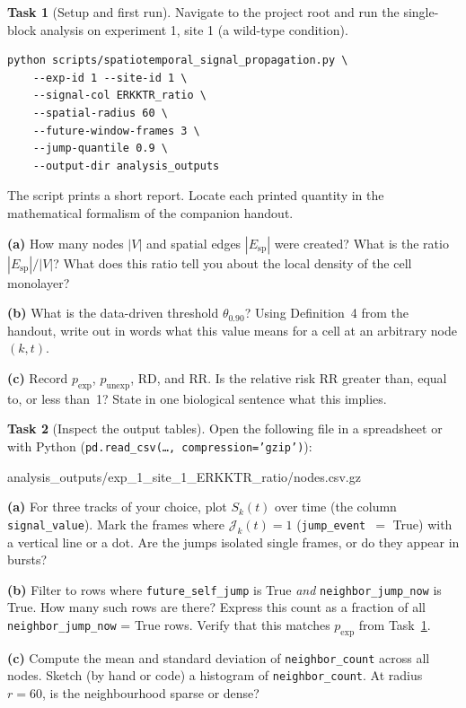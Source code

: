 \documentclass[11pt,a4paper]{article}
\theoremstyle{definition}
\newtheorem{task}{Task}
\newcommand{\sig}[2]{S_{#1}(#2)}
\newcommand{\JE}[2]{\mathcal{J}_{#1}(#2)}
\newcommand{\RD}{\mathrm{RD}}
\newcommand{\RR}{\mathrm{RR}}
\newcommand{\pE}{p_{\mathrm{exp}}}
\newcommand{\pU}{p_{\mathrm{unexp}}}
\newcommand{\1}[1]{\mathbf{1}\!\left[#1\right]}
\newcommand{\Thr}{\theta}
\newcommand{\cmd}[1]{\texttt{\small #1}}
\newcommand{\param}[1]{\texttt{#1}}
\newcommand{\filepath}[1]{%
  \par\smallskip
  \begin{center}%
    \colorbox{pathbg}{\small\ttfamily\strut\enspace #1\enspace}%
  \end{center}%
  \smallskip\noindent
}
\begin{document}
\begin{task}[Setup and first run]\label{task:first-run}
Navigate to the project root and run the single-block analysis on
experiment 1, site 1 (a wild-type condition).

\begin{framed}
\begin{verbatim}
python scripts/spatiotemporal_signal_propagation.py \
    --exp-id 1 --site-id 1 \
    --signal-col ERKKTR_ratio \
    --spatial-radius 60 \
    --future-window-frames 3 \
    --jump-quantile 0.9 \
    --output-dir analysis_outputs
\end{verbatim}
\end{framed}

The script prints a short report. Locate each printed quantity in the
mathematical formalism of the companion handout.

\medskip
\noindent\textbf{(a)} How many nodes $|V|$ and spatial edges $|E_{\mathrm{sp}}|$
were created? What is the ratio $|E_{\mathrm{sp}}|/|V|$? What does this ratio
tell you about the local density of the cell monolayer?



\noindent\textbf{(b)} What is the data-driven threshold $\Thr_{0.90}$?
Using Definition~4 from the handout, write out in words what this value means
for a cell at an arbitrary node $(k,t)$.



\noindent\textbf{(c)} Record $\pE$, $\pU$, $\RD$, and $\RR$.
Is the relative risk $\RR$ greater than, equal to, or less than~1?
State in one biological sentence what this implies.


\end{task}

\begin{task}[Inspect the output tables]\label{task:tables}
Open the following file in a spreadsheet or with Python
(\cmd{pd.read\_csv(\ldots, compression='gzip')}):
\filepath{analysis\_outputs/exp\_1\_site\_1\_ERKKTR\_ratio/nodes.csv.gz}

\medskip
\noindent\textbf{(a)} For three tracks of your choice, plot $\sig{k}{t}$ over time
(the column \param{signal\_value}).
Mark the frames where $\JE{k}{t}=1$ (\param{jump\_event}~$=$ True) with a
vertical line or a dot.
Are the jumps isolated single frames, or do they appear in bursts?



\noindent\textbf{(b)} Filter to rows where \param{future\_self\_jump} is True
\emph{and} \param{neighbor\_jump\_now} is True.
How many such rows are there?
Express this count as a fraction of all \param{neighbor\_jump\_now} = True rows.
Verify that this matches $\pE$ from Task~\ref{task:first-run}.



\noindent\textbf{(c)} Compute the mean and standard deviation of
\param{neighbor\_count} across all nodes.
Sketch (by hand or code) a histogram of \param{neighbor\_count}.
At radius $r = 60$, is the neighbourhood sparse or dense?


\end{task}
\end{document}
